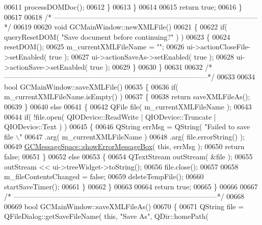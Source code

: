 \begin{DoxyCode}
{{{00611       processDOMDoc();
00612     \}
00613   \}
00614 
00615   \textcolor{keywordflow}{return} \textcolor{keyword}{true};
00616 \}
00617 
00618 \textcolor{comment}{/*
      --------------------------------------------------------------------------------------*/}
00619 
00620 \textcolor{keywordtype}{void} GCMainWindow::newXMLFile()
00621 \{
00622   \textcolor{keywordflow}{if}( queryResetDOM( \textcolor{stringliteral}{"Save document before continuing?"} ) )
00623   \{
00624     resetDOM();
00625     m\_currentXMLFileName = \textcolor{stringliteral}{""};
00626     ui->actionCloseFile->setEnabled( \textcolor{keyword}{true} );
00627     ui->actionSaveAs->setEnabled( \textcolor{keyword}{true} );
00628     ui->actionSave->setEnabled( \textcolor{keyword}{true} );
00629   \}
00630 \}
00631 
00632 \textcolor{comment}{/*
      --------------------------------------------------------------------------------------*/}
00633 
00634 \textcolor{keywordtype}{bool} GCMainWindow::saveXMLFile()
00635 \{
00636   \textcolor{keywordflow}{if}( m\_currentXMLFileName.isEmpty() )
00637   \{
00638     \textcolor{keywordflow}{return} saveXMLFileAs();
00639   \}
00640   \textcolor{keywordflow}{else}
00641   \{
00642     QFile file( m\_currentXMLFileName );
00643 
00644     \textcolor{keywordflow}{if}( !file.open( QIODevice::ReadWrite | QIODevice::Truncate | 
      QIODevice::Text ) )
00645     \{
00646       QString errMsg = QString( \textcolor{stringliteral}{"Failed to save file \(\backslash\)"%
00647                        .arg( m\_currentXMLFileName )
00648                        .arg( file.errorString() );
00649       \hyperlink{namespace_g_c_message_space_ab118b3a133686167617eb955029fd44e}{GCMessageSpace::showErrorMessageBox}( \textcolor{keyword}{this}, errMsg );
00650       \textcolor{keywordflow}{return} \textcolor{keyword}{false};
00651     \}
00652     \textcolor{keywordflow}{else}
00653     \{
00654       QTextStream outStream( &file );
00655       outStream << ui->treeWidget->toString();
00656       file.close();
00657 
00658       m\_fileContentsChanged = \textcolor{keyword}{false};
00659       deleteTempFile();
00660       startSaveTimer();
00661     \}
00662   \}
00663 
00664   \textcolor{keywordflow}{return} \textcolor{keyword}{true};
00665 \}
00666 
00667 \textcolor{comment}{/*
      --------------------------------------------------------------------------------------*/}
00668 
00669 \textcolor{keywordtype}{bool} GCMainWindow::saveXMLFileAs()
00670 \{
00671   QString file = QFileDialog::getSaveFileName( \textcolor{keyword}{this}, \textcolor{stringliteral}{"Save As"}, QDir::homePath(
}}}}
\end{DoxyCode}
